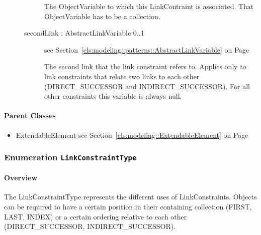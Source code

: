 \begin{description}
\begin{description}
	
			
The ObjectVariable to which this LinkContraint is associated. That ObjectVariable has to be a collection.	
		
	
\item[secondLink : AbstractLinkVariable 			\symbol{"5B}0..1\symbol{"5D}]
see Section~\ref{cls:modeling::patterns::AbstractLinkVariable} on Page~\pageref{cls:modeling::patterns::AbstractLinkVariable}
\hspace{\fill}
\nopagebreak


	
			
The second link that the link constraint refers to. Applies only to link constraints that relate two links to each other (DIRECT\_SUCCESSOR and INDIRECT\_SUCCESSOR). For all other constraints this variable is always null.	
		
	
	\end{description}
	

\end{description}

\paragraph{Parent Classes}
\begin{itemize}
\item ExtendableElement see Section~\ref{cls:modeling::ExtendableElement} on Page~\pageref{cls:modeling::ExtendableElement}\end{itemize}
\subsubsection{\Large{Enumeration \bfseries \texttt{LinkConstraintType}\normalfont}}
\label{cls:modeling::patterns::LinkConstraintType} 
\paragraph{Overview}
	
			
The LinkConstraintType represents the different uses of LinkConstraints. Objects can be required to have a certain position in their containing collection (FIRST, LAST, INDEX) or a certain ordering relative to each other (DIRECT\_SUCCESSOR, INDIRECT\_SUCCESSOR).	
		
	


